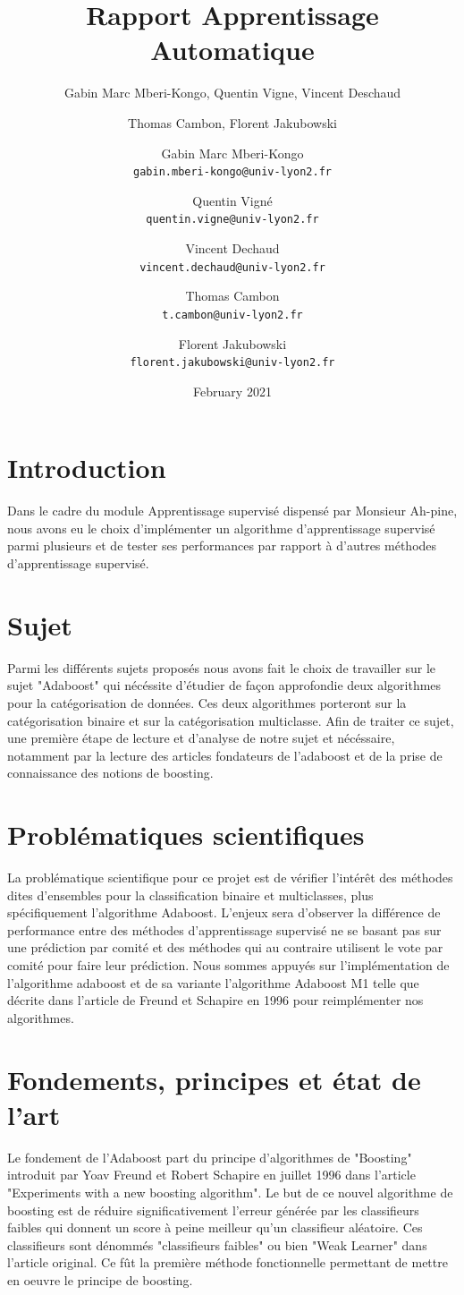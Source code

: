 \documentclass{article}
\title{Rapport Apprentissage Automatique}
\author{Gabin Marc Mberi-Kongo, Quentin Vigne, Vincent Deschaud}
\author{Thomas Cambon, Florent Jakubowski }
\author{
  Gabin Marc Mberi-Kongo\\
  \texttt{gabin.mberi-kongo@univ-lyon2.fr}
  \and
  Quentin Vigné\\
  \texttt{quentin.vigne@univ-lyon2.fr}
  \and
  Vincent Dechaud\\
  \texttt{vincent.dechaud@univ-lyon2.fr}
  \and
  Thomas Cambon\\
  \texttt{t.cambon@univ-lyon2.fr}
  \and
  Florent Jakubowski\\
  \texttt{florent.jakubowski@univ-lyon2.fr}
}
\date{February 2021}
\begin{document}
\maketitle

\tableofcontents

\section{Introduction}

Dans le cadre du module Apprentissage supervisé dispensé par Monsieur Ah-pine, nous avons eu le choix d'implémenter un algorithme d'apprentissage supervisé parmi plusieurs et de tester ses performances par rapport à d'autres méthodes d'apprentissage supervisé. 

\section{Sujet}
Parmi les différents sujets proposés nous avons fait le choix de travailler sur le sujet "Adaboost" qui nécéssite d'étudier de façon approfondie deux algorithmes pour la catégorisation de données. Ces deux algorithmes porteront sur la catégorisation binaire et sur la catégorisation multiclasse. Afin de traiter ce sujet, une première étape de lecture et d'analyse de notre sujet et nécéssaire, notamment par la lecture des articles fondateurs de l'adaboost et de la prise de connaissance des notions de boosting.  
\section{Problématiques scientifiques}
La problématique scientifique pour ce projet est de vérifier l'intérêt des méthodes dites d'ensembles pour la classification binaire et multiclasses, plus spécifiquement l'algorithme Adaboost. L'enjeux sera d'observer la différence de performance entre des méthodes d'apprentissage supervisé ne se basant pas sur une prédiction par comité et des méthodes qui au contraire utilisent le vote par comité pour faire leur prédiction.
Nous sommes appuyés sur l'implémentation de l'algorithme adaboost et de sa variante l'algorithme Adaboost M1 telle que décrite dans l'article de Freund et Schapire \citep{FreundSchapire1996} en 1996 pour reimplémenter nos algorithmes.

\section{Fondements, principes et état de l'art}
Le fondement de l'Adaboost part du principe d'algorithmes de "Boosting" introduit par Yoav Freund et Robert Schapire en juillet 1996 \citep{FreundSchapire1996} dans l'article "Experiments with a new boosting algorithm". Le but de ce nouvel algorithme de boosting est de réduire significativement l'erreur générée par les classifieurs faibles qui donnent un score à peine meilleur qu'un classifieur aléatoire. Ces classifieurs sont dénommés "classifieurs faibles" ou bien "Weak Learner" dans l'article original. Ce fût la première méthode fonctionnelle permettant de mettre en oeuvre le principe de boosting.
\end{document}
